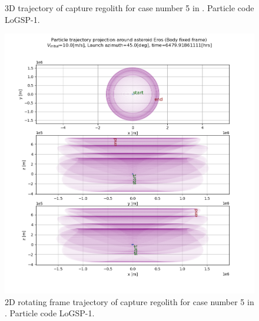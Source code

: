 \documentclass[print]{tudelft-report}
\begin{document}
\begin{appendices}
\begin{figure}[htb]
    \caption{3D trajectory of capture regolith for case number 5 in . Particle code LoGSP-1.}
    \label{fig:LoGSP_1_capture_case_5_3d_trajectory}
    \end{figure}
    \FloatBarrier
    \begin{figure}[htb]
    \centering
    \captionsetup{justification=centering}
    \includegraphics[width=\textwidth, height=\textheight]{Results/Images/longest_edge_perturbations/3.2Density_1cmSize/2dTrajectory_10ms_45Azimuth_315solarPhase_bodyFrame.png}
    \caption{2D rotating frame trajectory of capture regolith for case number 5 in . Particle code LoGSP-1.}
    \label{fig:LoGSP_1_capture_case_5_2d_traj_bodyFrame}
    \end{figure}
    \FloatBarrier
    \begin{figure}[htb]
    \centering
    \captionsetup{justification=centering}

\end{figure}
\end{appendices}
\end{document}
